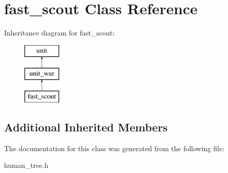 \hypertarget{classfast__scout}{}\section{fast\+\_\+scout Class Reference}
\label{classfast__scout}
Inheritance diagram for fast\+\_\+scout\+:\begin{figure}[H]
\begin{center}
\leavevmode
\includegraphics[height=3.000000cm]{classfast__scout}
\end{center}
\end{figure}
\subsection*{Additional Inherited Members}


The documentation for this class was generated from the following file\+:\begin{DoxyCompactItemize}
\item 
human\+\_\+tree.\+h\end{DoxyCompactItemize}
